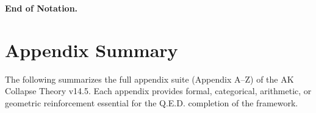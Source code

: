 \documentclass[11pt]{article}
\begin{document}
\vspace{1em}
\textbf{End of Notation.}




\section*{Appendix Summary}

The following summarizes the full appendix suite (Appendix A–Z) of the AK Collapse Theory v14.5. Each appendix provides formal, categorical, arithmetic, or geometric reinforcement essential for the Q.E.D. completion of the framework.
\end{document}
